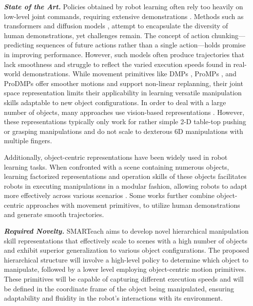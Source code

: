 \documentclass{erc-B2}
\begin{document}
\textit{\textbf{State of the Art.}}
Policies obtained by robot learning often rely too heavily on low-level joint commands, requiring extensive demonstrations \cite{David2024}. Methods such as transformers and diffusion models \cite{shafiullah2022behavior, chi2023diffusion, pearce2023imitating}, attempt to encapsulate the diversity of human demonstrations, yet challenges remain. The concept of action chunking\cite{zhao2023learning}—predicting sequences of future actions rather than a single action—holds promise in improving performance. However, such models often produce trajectories that lack smoothness and struggle to reflect the varied execution speeds found in real-world demonstrations. While movement primitives like DMPs \cite{schaal2006dynamic, ijspeert2013dynamical}, ProMPs \cite{paraschos2013probabilistic}, and ProDMPs \cite{li2023prodmp} offer smoother motions and support non-linear replanning, their joint space representation limits their applicability in learning versatile manipulation skills adaptable to new object configurations.
In order to deal with a large number of objects, many approaches use vision-based representations \cite{zeng2018learning, David2024, zeng2020tossingbot, serhan2022push}. However, these representations typically only work for rather simple 2-D table-top pushing or grasping manipulations and do not scale to dexterous 6D manipulations with multiple fingers. 

Additionally, object-centric representations have been widely used in robot learning tasks. When confronted with a scene containing numerous objects, learning factorized representations and operation skills of these objects facilitates robots in executing manipulations in a modular fashion, allowing robots to adapt more effectively across various scenarios \cite{zhu2023viola}. Some works \cite{carvalho2022adapting, gao2023k} further combine object-centric approaches with movement primitives, to utilize human demonstrations and generate smooth trajectories.

\textit{\textbf{Required Novelty.}} SMARTeach aims to develop novel hierarchical manipulation skill representations that effectively scale to scenes with a high number of objects and exhibit superior generalization to various object configurations. The proposed hierarchical structure will involve a high-level policy to determine which object to manipulate, followed by a lower level employing object-centric motion primitives. These primitives will be capable of capturing different execution speeds and will be defined in the coordinate frame of the object being manipulated, ensuring adaptability and fluidity in the robot’s interactions with its environment.
\end{document}
